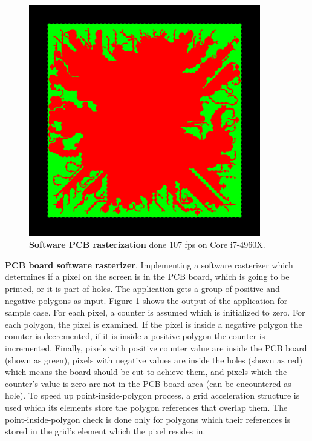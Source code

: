 \documentclass[]{report}
\begin{document}
\begin{figure}[!ht]
	\centering
	\includegraphics[width=0.90\textwidth]{./figs/rasterizer2D.png}
	\caption[PCB 2D Rasterization]{\textbf{Software PCB rasterization} done 107 fps on Core i7-4960X.}
	\label{fig:twodimRaster}
\end{figure}

\textbf{PCB board software rasterizer}. Implementing a software rasterizer which determines if a pixel on the screen is in the PCB board, which is going to be printed, or it is part of holes. The application gets a group of positive and negative polygons as input. Figure \ref{fig:twodimRaster} shows the output of the application for sample case. For each pixel, a counter is assumed which is initialized to zero. For each polygon, the pixel is examined. If the pixel is inside a negative polygon the counter is decremented, if it is inside a positive polygon the counter is incremented. Finally, pixels with positive counter value are inside the PCB board (shown as green), pixels with negative values are inside the holes (shown as red) which means the board should be cut to achieve them, and pixels which the counter's value is zero are not in the PCB board area (can be encountered as hole). To speed up point-inside-polygon process, a grid acceleration structure is used which its elements store the polygon references that overlap them. The point-inside-polygon check is done only for polygons which their references is stored in the grid's element which the pixel resides in.
\end{document}
